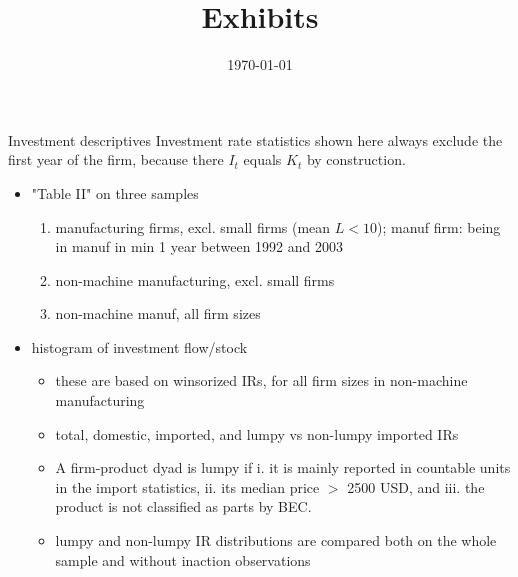 \documentclass[10pt]{beamer}
\title{Exhibits}
\subtitle {}
\author{}
\date{\today}
\begin{document}
\begin{frame}
    \titlepage
    \addtocounter{framenumber}{-1}
\end{frame}


\begin{frame}{Investment descriptives}
Investment rate statistics shown here always exclude the first year of the firm, because there $I_t$ equals $K_t$ by construction.
\medskip
\begin{itemize}
	\item "Table II" on three samples
	\begin{enumerate}
		\item manufacturing firms, excl. small firms (mean $L < 10$); manuf firm: being in manuf in min 1 year between 1992 and 2003
		\item non-machine manufacturing, excl. small firms
		\item non-machine manuf, all firm sizes
	\end{enumerate}
	\item histogram of investment flow/stock
  	\begin{itemize}
  		\item these are based on winsorized IRs, for all firm sizes in non-machine manufacturing
  		\item total, domestic, imported, and lumpy vs non-lumpy imported IRs
  		\item A firm-product dyad is lumpy if i. it is mainly reported in countable units in the import statistics, ii. its median price $>$ 2500 USD, and iii. the product is not classified as parts by BEC.
  		\item lumpy and non-lumpy IR distributions are compared both on the whole sample and without inaction observations
  \end{itemize}
\end{itemize}
\end{frame}
\end{document}

